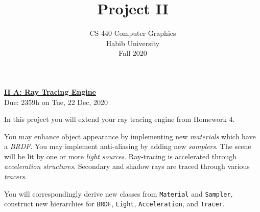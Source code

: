 \documentclass[addpoints]{exam}
\title{Project II}
\author{CS 440 Computer Graphics\\Habib University\\Fall 2020}
\date{}
\begin{document}
\maketitle
\thispagestyle{empty}

\begin{flushleft}
  \Large{\underline{\bf II A: Ray Tracing Engine}}\\\smallskip
  \large{Due: 2359h on Tue, 22 Dec, 2020}
\end{flushleft}

In this project you will extend your ray tracing engine from Homework 4.

You may enhance object appearance by implementing new \emph{materials} which have a \emph{BRDF}. You may implement anti-aliasing by adding new \textit{samplers}. The scene will be lit by one or more \emph{light sources}. Ray-tracing is accelerated through \textit{acceleration structures}. Secondary and shadow rays are traced through various \textit{tracers}.

You will correspondingly derive new classes from \texttt{Material} and \texttt{Sampler}, construct new hierarchies for \texttt{BRDF}, \texttt{Light}, \texttt{Acceleration}, and \texttt{Tracer}.
\end{document}
